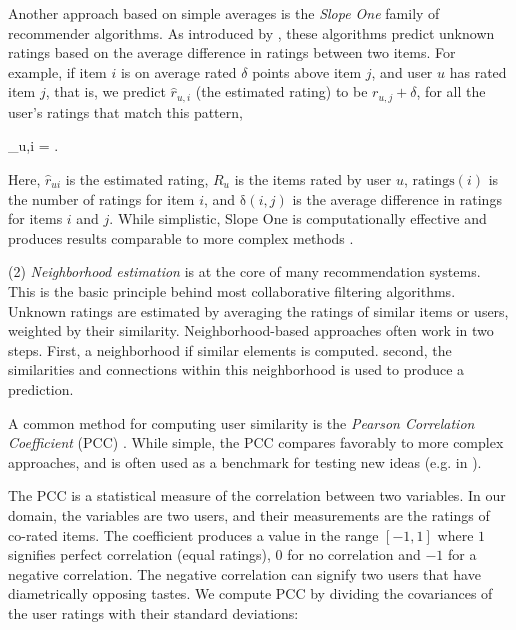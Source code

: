 Another approach based on simple averages is the  \emph{Slope One} family of recommender algorithms. 
As introduced by \cite{Lemire2005}, these algorithms predict unknown ratings based on the average difference in ratings between two items. 
For example, if item $i$ is on average rated $\delta$ points above item $j$, and user $u$ has rated item $j$,
that is, we predict $\hat{r}_{u,i}$ (the estimated rating) to be $r_{u,j} + \delta$, for all the user's ratings that match this pattern,

\begin{eqsp}
  _{u,i} = .
\end{eqsp}

Here, $\hat{r}_{ui}$ is the estimated rating, $R_u$ is the items rated by user $u$, $\mathrm{ratings}(i)$ is the number of ratings for item $i$,
and $\mathrm{\delta}(i,j)$ is the average difference in ratings for items $i$ and $j$.
While simplistic, Slope One is computationally effective and produces results comparable to more complex methods \cite[p5]{Lemire2005}.

(2) \emph{Neighborhood estimation} is at the core of many recommendation systems. 
This is the basic principle behind most collaborative filtering algorithms. 
Unknown ratings are estimated by averaging the ratings of similar items or users, weighted by their similarity.
Neighborhood-based approaches often work in two steps. First, a neighborhood if similar elements is computed.
second, the similarities and connections within this neighborhood is used to produce a prediction.

A common method for computing user similarity is the \emph{Pearson Correlation Coefficient} (PCC) \cite[p11]{Segaran2007}.
While simple, the PCC compares favorably to more complex approaches, and is often used as a benchmark 
for testing new ideas (e.g. in \citet{Lemire2005, Ujjin, Konstas}).

The PCC is a statistical measure of the correlation between two variables. In our domain, the variables
are two users, and their measurements are the ratings of co-rated items. 
The coefficient produces a value in the range $[-1,1]$ where $1$ signifies perfect correlation (equal ratings),
$0$ for no correlation and $-1$ for a negative correlation.
The negative correlation can signify two users that have diametrically opposing tastes.
We compute PCC by dividing the covariances of the user ratings with their standard deviations:

